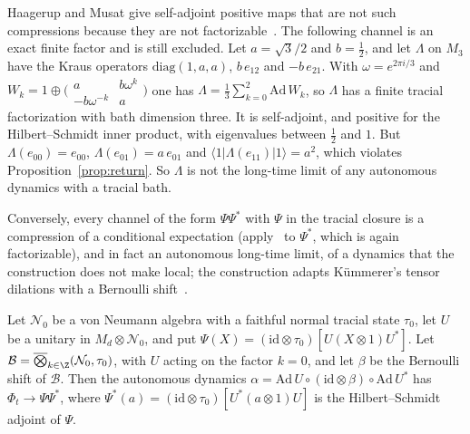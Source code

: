\begin{remark}\label{rem:qutrit}
Haagerup and Musat give self-adjoint positive maps that are not such compressions because they are not
factorizable~\cite[Theorem~5.4]{HaagerupMusat2011}. The following channel is an exact finite factor and is still excluded. Let $a=\sqrt3/2$ and $b=\frac12$, and let $\Lambda$ on $M_3$ have the Kraus operators $\mathrm{diag}(1,a,a)$, $b\,e_{12}$ and $-b\,e_{21}$. With
$\omega=e^{2\pi i/3}$ and $W_k=1\oplus\bigl(\begin{smallmatrix}a&b\omega^k\\-b\omega^{-k}&a\end{smallmatrix}\bigr)$ one has
$\Lambda=\frac13\sum_{k=0}^2\mathrm{Ad}\,W_k$, so $\Lambda$ has a finite tracial factorization with bath dimension three. It is self-adjoint, and positive
for the Hilbert--Schmidt inner product, with eigenvalues between $\frac12$ and $1$. But $\Lambda(e_{00})=e_{00}$, $\Lambda(e_{01})=a\,e_{01}$ and
$\langle1|\Lambda(e_{11})|1\rangle=a^2$, which violates Proposition~\ref{prop:return}. So $\Lambda$ is not the long-time limit of any autonomous dynamics
with a tracial bath.
\end{remark}

Conversely, every channel of the form $\Psi\Psi^*$ with $\Psi$ in the tracial closure is a compression of a conditional
expectation (apply~\cite[Theorem~5.9]{HaagerupMusat2011} to $\Psi^*$, which is again factorizable), and in fact an autonomous long-time limit, of a dynamics that the construction does not make
local; the construction adapts Kümmerer's tensor dilations with a Bernoulli shift~\cite{Kummerer1985}.

\begin{proposition}\label{prop:nonlocal}
Let $\mathcal N_0$ be a von Neumann algebra with a faithful normal tracial state $\tau_0$, let $U$ be a unitary in $M_d\otimes\mathcal N_0$, and put
$\Psi(X)=(\mathrm{id}\otimes\tau_0)[U(X\otimes1)U^*]$. Let $\mathcal B=\overline\bigotimes_{k\in\Z}(\mathcal N_0,\tau_0)$, with $U$ acting on the factor
$k=0$, and let $\beta$ be the Bernoulli shift of $\mathcal B$. Then the autonomous dynamics $\alpha=\mathrm{Ad}\,U\circ(\mathrm{id}\otimes\beta)\circ\mathrm{Ad}\,U^*$
has $\Phi_t\to\Psi\Psi^*$, where $\Psi^*(a)=(\mathrm{id}\otimes\tau_0)[U^*(a\otimes1)U]$ is the Hilbert--Schmidt adjoint of $\Psi$.
\end{proposition}

